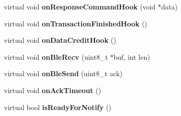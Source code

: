 \begin{DoxyCompactItemize}
\item 
\hypertarget{classble_serial_a2f82a35441cc6b665d7cf5601ec55a21}{virtual void {\bfseries on\-Response\-Command\-Hook} (void $\ast$data)}\label{classble_serial_a2f82a35441cc6b665d7cf5601ec55a21}

\item 
\hypertarget{classble_serial_ad6b05e410f4657b7200c6647e32e038a}{virtual void {\bfseries on\-Transaction\-Finished\-Hook} ()}\label{classble_serial_ad6b05e410f4657b7200c6647e32e038a}

\item 
\hypertarget{classble_serial_afd42ac331707275a59f6650e7fa56fd7}{virtual void {\bfseries on\-Data\-Credit\-Hook} ()}\label{classble_serial_afd42ac331707275a59f6650e7fa56fd7}

\item 
\hypertarget{classble_serial_abb13261f594e07d64a62da1bf99b963d}{virtual void {\bfseries on\-Ble\-Recv} (uint8\-\_\-t $\ast$buf, int len)}\label{classble_serial_abb13261f594e07d64a62da1bf99b963d}

\item 
\hypertarget{classble_serial_a75d22ee17d44dedd645672c0c9a7172c}{virtual void {\bfseries on\-Ble\-Send} (uint8\-\_\-t ack)}\label{classble_serial_a75d22ee17d44dedd645672c0c9a7172c}

\item 
\hypertarget{classble_serial_ab3fa388b725e7a59d2a207dbee495cc1}{virtual void {\bfseries on\-Ack\-Timeout} ()}\label{classble_serial_ab3fa388b725e7a59d2a207dbee495cc1}

\item 
\hypertarget{classble_serial_a096ec418d87a2343f3aeba6ebdf75f33}{virtual bool {\bfseries is\-Ready\-For\-Notify} ()}\label{classble_serial_a096ec418d87a2343f3aeba6ebdf75f33}

\end{DoxyCompactItemize}
